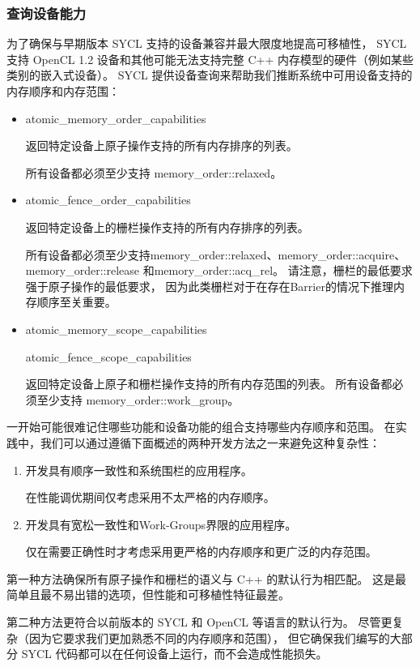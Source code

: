 \subsubsection{查询设备能力}
为了确保与早期版本 SYCL 支持的设备兼容并最大限度地提高可移植性，
SYCL 支持 OpenCL 1.2 设备和其他可能无法支持完整 C++ 内存模型的硬件（例如某些类别的嵌入式设备）。 
SYCL 提供设备查询来帮助我们推断系统中可用设备支持的内存顺序和内存范围：

\begin{itemize}
	\item atomic\_memory\_order\_capabilities

	返回特定设备上原子操作支持的所有内存排序的列表。

	所有设备都必须至少支持 memory\_order::relaxed。

	\item atomic\_fence\_order\_capabilities

	返回特定设备上的栅栏操作支持的所有内存排序的列表。

	所有设备都必须至少支持memory\_order::relaxed、memory\_order::acquire、memory\_order::release 
	和memory\_order::acq\_rel。 请注意，栅栏的最低要求强于原子操作的最低要求，
	因为此类栅栏对于在存在Barrier的情况下推理内存顺序至关重要。

	\item atomic\_memory\_scope\_capabilities

	atomic\_fence\_scope\_capabilities

	返回特定设备上原子和栅栏操作支持的所有内存范围的列表。 所有设备都必须至少支持 memory\_order::work\_group。
\end{itemize}

一开始可能很难记住哪些功能和设备功能的组合支持哪些内存顺序和范围。 
在实践中，我们可以通过遵循下面概述的两种开发方法之一来避免这种复杂性：
\begin{enumerate}
	\item 开发具有顺序一致性和系统围栏的应用程序。

	在性能调优期间仅考虑采用不太严格的内存顺序。

	\item 开发具有宽松一致性和Work-Groups界限的应用程序。

	仅在需要正确性时才考虑采用更严格的内存顺序和更广泛的内存范围。
\end{enumerate}

第一种方法确保所有原子操作和栅栏的语义与 C++ 的默认行为相匹配。 
这是最简单且最不易出错的选项，但性能和可移植性特征最差。

第二种方法更符合以前版本的 SYCL 和 OpenCL 等语言的默认行为。 
尽管更复杂（因为它要求我们更加熟悉不同的内存顺序和范围），
但它确保我们编写的大部分 SYCL 代码都可以在任何设备上运行，而不会造成性能损失。

